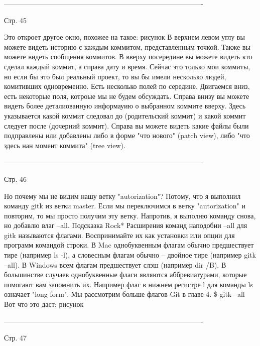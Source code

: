 -------------------------------------------------------------------------------------

Стр. 45

Это откроет другое окно, похожее на такое:
{рисунок}
В верхнем левом углу вы можете видеть историю с каждым коммитом, представленным точкой.
Также вы можете видеть сообщения коммитов. В вверху посередине вы можете видеть кто 
сделал каждый коммит, а справа дату и время. Сейчас это только мои коммиты, но если бы
это был реальный проект, то вы бы имели несколько людей, комитивших одновременно. Есть
несколько полей по середине. Двигаемся вниз, есть некоторые поля, котроые мы не будем
обсуждать. Справа внизу вы можете видеть более деталиованную информауию о выбранном
коммите вверху. Здесь указывается какой коммит следовал до (родительский коммит) и
какой коммит следует после (дочерний коммит). Справа вы можете видеть какие файлы
были подправлены или добавлены либо в форме "что нового" (patch view), либо "что здесь
нан момент коммита" (tree view).

-------------------------------------------------------------------------------------

Стр. 46

Но почему мы не видим нашу ветку "autorization"? Потому, что я выполнил команду gitk
из ветки master. Если мы переключимся в ветку "autorization" и повторим, то мы просто
получим эту ветку. Напротив, я выполню команду снова, но добавлю влаг --all.
        Подсказка Rock*
        Расширения команд наподобии --all для gitk называются флагами. Воспринимайте
        их как установки или опции для программ командой строки. В Mac однобуквенным
        флагам обычно предшествует тире (например ls -l), а словесным флагам обычно --
        двойное тире (например gitk --all). В Windows всем флагам предшествует слэш 
        (например dir /B). В большинстве случаев однобуквенные флаги являются
        аббревиатурами, которые помогают вам запомнить их. Например флаг в нижнем
        регистре l для команды ls означает "long form". Мы рассмотрим больше флагов
        Git в главе 4.
\$ gitk --all
Вот что это даст:
{рисунок}

-------------------------------------------------------------------------------------

Стр. 47


